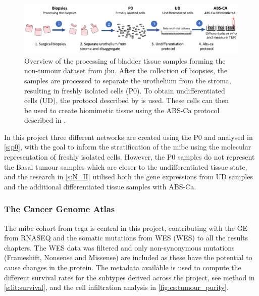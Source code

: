 \begin{figure}[!b]
    \centering
    \includegraphics[width=1.0\textwidth, keepaspectratio]{Sections/Lit_review/Resources/differentiation.png}
    \caption[How the biopsies from the non-tumour dataset are processed]{Overview of the processing of bladder tissue samples forming the non-tumour dataset from \acrfull{jbu}. After the collection of biopsies, the samples are processed to separate the urothelium from the stroma, resulting in freshly isolated cells (P0). To obtain undifferentiated cells (UD), the protocol described by \citet{Cross2005-fe} is used. These cells can then be used to create biomimetic tissue using the ABS-Ca protocol described in \citet{Cross2005-fe}.}
    \label{fig:lit:diff_samples}
\end{figure}


In this project three different networks are created using the P0 and analysed in \cref{s:p0}, with the goal to inform the stratification of the \acrshort{mibc} using the molecular representation of freshly isolated cells. However, the P0 samples do not represent the Basal tumour samples which are closer to the  undifferentiated tissue state, and the research in \cref{s:N_II} utilised both the gene expressions from UD samples and the additional differentiated tissue samples with ABS-Ca.

\subsubsection*{The Cancer Genome Atlas} \label{s:lit:tcga_data}

The \acrshort{mibc} cohort from \acrfull{tcga} is central in this project, contributing with the \gls{GE} from \gls{RNASEQ} and the somatic mutations from \gls{WES} (WES) to all the results chapters.  The WES data was filtered and only non-synonymous mutations (Frameshift, Nonsense and Missense) are included as these have the potential to cause changes in the protein. The metadata available is used to compute the different survival rates for the subtypes derived across the project, see method in \cref{s:lit:survival}, and the cell infiltration analysis in \cref{fig:cs:tumour_purity}.
